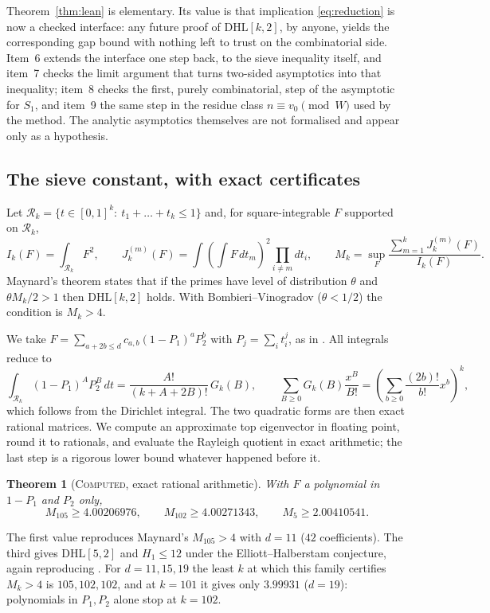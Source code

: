 \documentclass[11pt]{amsart}
\newtheorem{theorem}{Theorem}
\theoremstyle{definition}
\theoremstyle{remark}
\newcommand{\lbl}[1]{\textup{\textsc{#1}}}
\newcommand{\DHL}{\mathrm{DHL}}
\newcommand{\R}{\mathcal{R}}
\begin{document}
Theorem~\ref{thm:lean} is elementary. Its value is that implication
\eqref{eq:reduction} is now a checked interface: any future proof of
$\DHL[k,2]$, by anyone, yields the corresponding gap bound with nothing left
to trust on the combinatorial side. Item~6 extends the interface one step
back, to the sieve inequality itself, and item~7 checks the limit argument
that turns two-sided asymptotics into that inequality; item~8 checks the
first, purely combinatorial, step of the asymptotic for $S_1$, and item~9 the
same step in the residue class $n\equiv v_0\pmod W$ used by the method. The analytic
asymptotics themselves are not formalised and appear only as a hypothesis.

\subsection{The sieve constant, with exact certificates}

Let $\R_k=\{t\in[0,1]^k:\ t_1+\dots+t_k\le1\}$ and, for square-integrable $F$
supported on $\R_k$,
\[
I_k(F)=\int_{\R_k}F^2,\qquad
J_k^{(m)}(F)=\int\left(\int F\,dt_m\right)^{2}\prod_{i\ne m}dt_i,\qquad
M_k=\sup_F\frac{\sum_{m=1}^{k}J_k^{(m)}(F)}{I_k(F)}.
\]
Maynard's theorem \cite[Prop.~4.2]{May15} states that if the primes have level
of distribution $\theta$ and $\theta M_k/2>1$ then $\DHL[k,2]$ holds. With
Bombieri--Vinogradov ($\theta<1/2$) the condition is $M_k>4$.

We take $F=\sum_{a+2b\le d}c_{a,b}(1-P_1)^aP_2^b$ with $P_j=\sum_it_i^j$, as
in \cite[\S8]{May15}. All integrals reduce to
\[
\int_{\R_k}(1-P_1)^AP_2^B\,dt=\frac{A!}{(k+A+2B)!}\,G_k(B),\qquad
\sum_{B\ge0}G_k(B)\frac{x^B}{B!}=\left(\sum_{b\ge0}\frac{(2b)!}{b!}x^b\right)^{k},
\]
which follows from the Dirichlet integral. The two quadratic forms are then
exact rational matrices. We compute an approximate top eigenvector in
floating point, round it to rationals, and evaluate the Rayleigh quotient in
exact arithmetic; the last step is a rigorous lower bound whatever happened
before it.

\begin{theorem}[\lbl{Computed}, exact rational arithmetic]\label{thm:Mk0}
With $F$ a polynomial in $1-P_1$ and $P_2$ only,
\[
M_{105}\ge4.00206976,\qquad M_{102}\ge4.00271343,\qquad M_{5}\ge2.00410541 .
\]
\end{theorem}

The first value reproduces Maynard's $M_{105}>4$ with $d=11$ ($42$
coefficients). The third gives $\DHL[5,2]$ and $H_1\le12$ under the
Elliott--Halberstam conjecture, again reproducing \cite{May15}. For
$d=11,15,19$ the least $k$ at which this family certifies $M_k>4$ is
$105,102,102$, and at $k=101$ it gives only $3.99931$ ($d=19$): polynomials in
$P_1,P_2$ alone stop at $k=102$.
\end{document}

